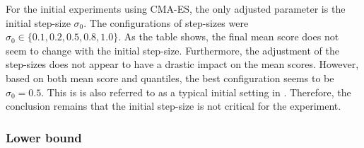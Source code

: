 
For the initial experiments using CMA-ES, 
the only adjusted parameter is the initial 
step-size $\sigma_0$. The configurations of step-sizes were 
$\sigma_0 \in \{0.1, 0.2, 0.5, 0.8, 1.0\}$. As the table shows,
the final mean score does not seem to change with the initial step-size.
Furthermore, the adjustment of the step-sizes does not appear to 
have a drastic impact on the mean scores. However, based on both mean score and
quantiles, the best configuration seems to be $\sigma_0 = 0.5$. This is 
is also referred to as a typical initial setting in \citep{boumaza2009}.
Therefore, the conclusion remains that the initial step-size is not critical 
for the experiment.\\


\subsubsection{Lower bound}

